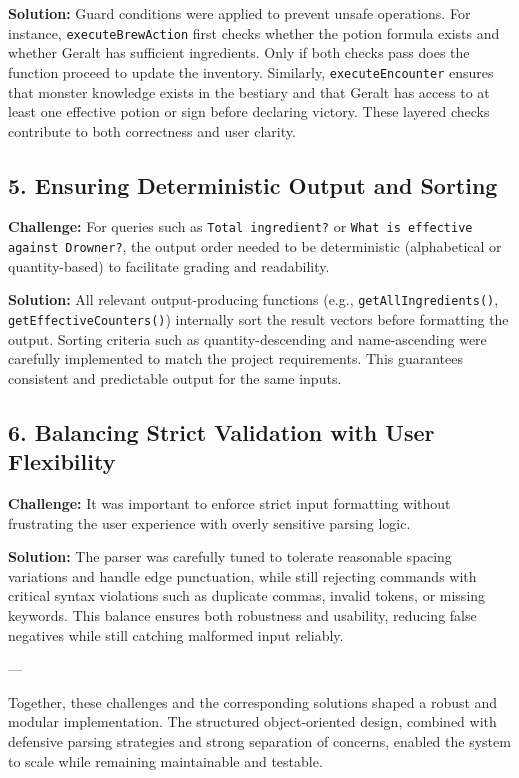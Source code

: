 \documentclass{article}
\begin{document}
\textbf{Solution:}  
Guard conditions were applied to prevent unsafe operations. For instance, \texttt{executeBrewAction} first checks whether the potion formula exists and whether Geralt has sufficient ingredients. Only if both checks pass does the function proceed to update the inventory. Similarly, \texttt{executeEncounter} ensures that monster knowledge exists in the bestiary and that Geralt has access to at least one effective potion or sign before declaring victory. These layered checks contribute to both correctness and user clarity.

\subsection*{5. Ensuring Deterministic Output and Sorting}

\textbf{Challenge:}  
For queries such as \texttt{Total ingredient?} or \texttt{What is effective against Drowner?}, the output order needed to be deterministic (alphabetical or quantity-based) to facilitate grading and readability.

\textbf{Solution:}  
All relevant output-producing functions (e.g., \texttt{getAllIngredients()}, \texttt{getEffectiveCounters()}) internally sort the result vectors before formatting the output. Sorting criteria such as quantity-descending and name-ascending were carefully implemented to match the project requirements. This guarantees consistent and predictable output for the same inputs.

\subsection*{6. Balancing Strict Validation with User Flexibility}

\textbf{Challenge:}  
It was important to enforce strict input formatting without frustrating the user experience with overly sensitive parsing logic.

\textbf{Solution:}  
The parser was carefully tuned to tolerate reasonable spacing variations and handle edge punctuation, while still rejecting commands with critical syntax violations such as duplicate commas, invalid tokens, or missing keywords. This balance ensures both robustness and usability, reducing false negatives while still catching malformed input reliably.

---

Together, these challenges and the corresponding solutions shaped a robust and modular implementation. The structured object-oriented design, combined with defensive parsing strategies and strong separation of concerns, enabled the system to scale while remaining maintainable and testable.
\end{document}
